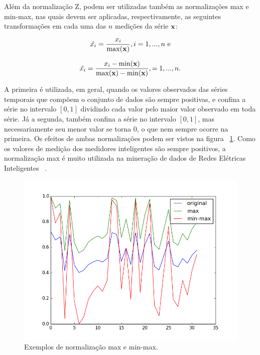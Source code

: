 Além da normalização Z, podem ser utilizadas também as normalizações max e min-max, nas quais devem ser aplicadas, respectivamente, as seguintes transformações em cada uma das $n$ medições da série $\bf{x}$:

\begin{equation}
\hat{x_i} = \frac{x_i}{\max(\bf{x})}, i = 1,...,n \text{          e}
\end{equation}

\begin{equation}
\hat{x_i} = \frac{x_i-\min(\bf{x})}{\max(\bf{x}) - \min(\bf{x})},  = 1,...,n.
\end{equation}

A primeira é utilizada, em geral, quando os valores observados das séries temporais que compõem o conjunto de dados são sempre positivas, e confina a série no intervalo $[0,1]$ dividindo cada valor pelo maior valor observado em toda série. Já a segunda, também confina a série no intervalo $[0,1]$, mas necessariamente seu menor valor se torna $0$, o que nem sempre ocorre na primeira. Os efeitos de ambas normalizações podem ser vistos na figura ~\ref{fig:norms}. Como os valores de medição dos medidores inteligentes são sempre positivos, a normalização max é muito utilizada na mineração de dados de Redes Elétricas Inteligentes ~\parencite{Chicco}.

\begin{figure}[h!]
	\includegraphics[width=\linewidth]{figuras/normalizations.png}
	\caption{Exemplos de normalização max e min-max.}
	\label{fig:norms}
\end{figure}

